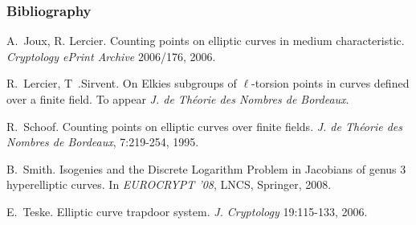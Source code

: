 \documentclass[10pt]{beamer}
\newcommand{\0}{\mathcal{O}}  %
\begin{document}
\begin{frame}
  \frametitle{Bibliography}

  \begin{thebibliography}{1}

  A.~Joux, R. Lercier.
    \newblock Counting points on elliptic curves in medium characteristic.
    \newblock \emph{Cryptology ePrint Archive} 2006/176, 2006.

  R.~Lercier, T~.Sirvent.
    \newblock On Elkies subgroups of $\ell$-torsion points in curves
    defined over a finite field.
    \newblock To appear \emph{J. de Théorie des Nombres de Bordeaux}.

   R.~Schoof. \newblock Counting points on
    elliptic curves over finite fields. \newblock \emph{J. de Théorie
      des Nombres de Bordeaux}, 7:219-254, 1995.

   B.~Smith.  \newblock Isogenies and the
    Discrete Logarithm Problem in Jacobians of genus $3$ hyperelliptic
    curves.
    \newblock In \emph{EUROCRYPT '08}, LNCS, Springer, 2008.

   E.~Teske. \newblock Elliptic curve
    trapdoor system. \newblock \emph{J. Cryptology} 19:115-133, 2006.

  \end{thebibliography}
\end{frame}
\end{document}
